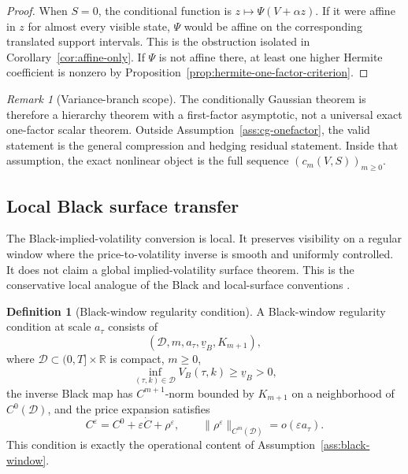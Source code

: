 \documentclass[11pt,a4paper]{amsart}
\theoremstyle{plain}
\theoremstyle{definition}
\newtheorem{definition}[theorem]{Definition}
\theoremstyle{remark}
\newtheorem{remark}[theorem]{Remark}
\newcommand{\R}{\mathbb{R}}
\newcommand{\cD}{\mathcal{D}}
\begin{document}
\begin{proof}
When \(S=0\), the conditional function is \(z\mapsto \Psi(V+\alpha z)\).  If it were affine in
\(z\) for almost every visible state, \(\Psi\) would be affine on the corresponding translated
support intervals.  This is the obstruction isolated in Corollary~\ref{cor:affine-only}.  If
\(\Psi\) is not affine there, at least one higher Hermite coefficient is nonzero by
Proposition~\ref{prop:hermite-one-factor-criterion}.
\end{proof}

\begin{remark}[Variance-branch scope]
\label{rem:variance-branch-scope-developed}
The conditionally Gaussian theorem is therefore a hierarchy theorem with a first-factor
asymptotic, not a universal exact one-factor scalar theorem.  Outside
Assumption~\ref{ass:cg-onefactor}, the valid statement is the general compression and
hedging residual statement.  Inside that assumption, the exact nonlinear object is the full
sequence \((c_m(V,S))_{m\ge0}\).
\end{remark}

\subsection{Local Black surface transfer}
\label{subsec:black-local-scope}

The Black-implied-volatility conversion is local.  It preserves visibility on a
regular window where the price-to-volatility inverse is smooth and uniformly controlled.  It does
not claim a global implied-volatility surface theorem.  This is the conservative local analogue of
the Black and local-surface conventions \cite{black1976,dupire1994}.

\begin{definition}[Black-window regularity condition]
\label{def:black-window-certificate}
A Black-window regularity condition at scale \(a_\tau\) consists of
\[
        (\cD,m,a_\tau,\underline v_B,K_{m+1}),
\]
where \(\cD\subset(0,T]\times\R\) is compact, \(m\ge0\),
\[
        \inf_{(\tau,k)\in\cD}V_B(\tau,k)\ge \underline v_B>0,
\]
the inverse Black map has \(C^{m+1}\)-norm bounded by \(K_{m+1}\) on a neighborhood of
\(C^0(\cD)\), and the price expansion satisfies
\[
        C^\varepsilon=C^0+\varepsilon\dot C+\rho^\varepsilon,
        \qquad
        \|\rho^\varepsilon\|_{C^m(\cD)}=o(\varepsilon a_\tau).
\]
This condition is exactly the operational content of Assumption~\ref{ass:black-window}.
\end{definition}
\end{document}

